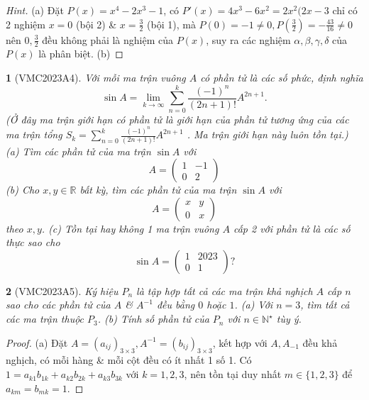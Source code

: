 \documentclass{article}
\newtheorem{baitoan}{}
\begin{document}
\begin{proof}[Hint]
	(a) Đặt $P(x) = x^4 - 2x^3 - 1$, có $P'(x) = 4x^3 - 6x^2 = 2x^2(2x - 3$ chỉ có 2 nghiệm $x = 0$ (bội 2) \& $x = \frac{3}{2}$ (bội 1), mà $P(0) = -1\ne0,P(\frac{3}{2}) = -\frac{43}{16}\ne0$ nên $0,\frac{3}{2}$ đều không phải là nghiệm của $P(x)$, suy ra các nghiệm $\alpha,\beta,\gamma,\delta$ của $P(x)$ là phân biệt. (b) 
\end{proof}

\begin{baitoan}[VMC2023A4]
	Với mỗi ma trận vuông $A$ có phần tử là các số phức, định nghĩa
	\begin{equation}
		\sin A = \lim_{k\to\infty} \sum_{n=0}^k \frac{(-1)^n}{(2n + 1)!}A^{2n + 1}.
	\end{equation}
	(Ở đây ma trận giới hạn có phần tử là giới hạn của phần tử tương ứng của các ma trận tổng $S_k = \sum_{n=0}^k \frac{(-1)^n}{(2n + 1)!}A^{2n + 1}$ . Ma trận giới hạn này luôn tồn tại.) (a) Tìm các phần tử của ma trận $\sin A$ với
	\begin{equation}
		A = \begin{pmatrix}
			1 & -1\\0 & 2
		\end{pmatrix}
	\end{equation}
	(b) Cho $x,y\in\mathbb{R}$ bất kỳ, tìm các phần tử của ma trận $\sin A$ với
	\begin{equation}
		A = \begin{pmatrix}
			x & y\\0 & x
		\end{pmatrix}
	\end{equation}
	theo $x,y$. (c) Tồn tại hay không 1 ma trận vuông $A$ cấp 2 với phần tử là các số thực sao cho
	\begin{equation}
		\sin A = \begin{pmatrix}
			1 & 2023\\0 & 1
		\end{pmatrix}?
	\end{equation}
\end{baitoan}

\begin{baitoan}[VMC2023A5]
	Ký hiệu $P_n$ là tập hợp tất cả các ma trận khả nghịch $A$ cấp $n$ sao cho các phần tử của $A$ \& $A^{-1}$ đều bằng $0$ hoặc $1$. (a) Với $n = 3$, tìm tất cả các ma trận thuộc $P_3$. (b) Tính số phần tử của $P_n$ với $n\in\mathbb{N}^\star$ tùy ý.
\end{baitoan}

\begin{proof}
	(a) Đặt $A = (a_{ij})_{3\times3},A^{-1} = (b_{ij})_{3\times3}$, kết hợp với $A,A_{-1}$ đều khả nghịch, có mỗi hàng \& mỗi cột đều có ít nhất 1 số 1. Có $1 = a_{k1}b_{1k} + a_{k2}b_{2k} + a_{k3}b_{3k}$ với $k = 1,2,3$, nên tồn tại duy nhất $m\in\{1,2,3\}$ để $a_{km} = b_{mk} = 1$.
\end{proof}
\end{document}
